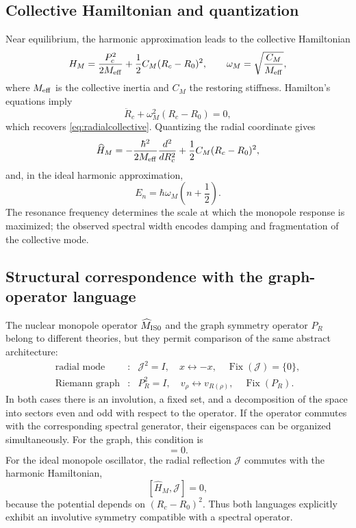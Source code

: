 \documentclass[11pt]{amsart}
\theoremstyle{definition}
\theoremstyle{remark}
\begin{document}
\subsection{Collective Hamiltonian and quantization}
Near equilibrium, the harmonic approximation leads to the collective Hamiltonian
\begin{equation}\label{eq:monoham}
 H_M=\frac{P_c^2}{2M_{\rm eff}}
     +\frac12 C_M(R_c-R_0)^2,
 \qquad
 \omega_M=\sqrt{\frac{C_M}{M_{\rm eff}}},
\end{equation}
where $M_{\rm eff}$ is the collective inertia and $C_M$ the restoring stiffness. Hamilton's equations imply
\begin{equation}
  \ddot R_c+\omega_M^2(R_c-R_0)=0,
\end{equation}
which recovers \eqref{eq:radialcollective}. Quantizing the radial coordinate gives
\begin{equation}\label{eq:monohamq}
 \widehat H_M=
 -\frac{\hbar^2}{2M_{\rm eff}}\frac{d^2}{dR_c^2}
 +\frac12 C_M(R_c-R_0)^2,
\end{equation}
and, in the ideal harmonic approximation,
\begin{equation}
 E_n=\hbar\omega_M\left(n+\frac12\right).
\end{equation}
The resonance frequency determines the scale at which the monopole response is maximized; the observed spectral width encodes damping and fragmentation of the collective mode.

\subsection{Structural correspondence with the graph-operator language}
The nuclear monopole operator $\widehat M_{\rm IS0}$ and the graph symmetry operator $P_R$ belong to different theories, but they permit comparison of the same abstract architecture:
\begin{equation}\label{eq:operatorparallel}
\begin{array}{ccc}
\text{radial mode} &:& \mathcal J^2=I,\quad x\leftrightarrow -x,\quad \operatorname{Fix}(\mathcal J)=\{0\},\\[1mm]
\text{Riemann graph} &:& P_R^2=I,\quad v_\rho\leftrightarrow v_{R(\rho)},\quad \operatorname{Fix}(P_R).
\end{array}
\end{equation}
In both cases there is an involution, a fixed set, and a decomposition of the space into sectors even and odd with respect to the operator. If the operator commutes with the corresponding spectral generator, their eigenspaces can be organized simultaneously. For the graph, this condition is
\begin{equation}
 [L,P_R]=0.
\end{equation}
For the ideal monopole oscillator, the radial reflection $\mathcal J$ commutes with the harmonic Hamiltonian,
\begin{equation}\label{eq:monoparity}
 [\widehat H_M,\mathcal J]=0,
\end{equation}
because the potential depends on $(R_c-R_0)^2$. Thus both languages explicitly exhibit an involutive symmetry compatible with a spectral operator.
\end{document}
